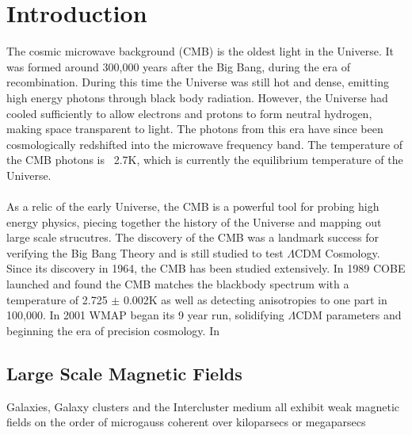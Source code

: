 \section{Introduction}

The cosmic microwave background (CMB) is the oldest light in the Universe. It was formed around 300,000 years after the Big Bang, during the era of recombination. During this time the Universe was still hot and dense, emitting high energy photons through black body radiation. However, the Universe had cooled sufficiently to allow electrons and protons to form neutral hydrogen, making space transparent to light. The photons from this era have since been cosmologically redshifted into the microwave frequency band. The temperature of the CMB photons is ~2.7K, which is currently the equilibrium temperature of the Universe. 
\\\\
As a relic of the early Universe, the CMB is a powerful tool for probing high energy physics, piecing together the history of the Universe and mapping out large scale strucutres. The discovery of the CMB was a landmark success for verifying the Big Bang Theory and is still studied to test $\Lambda$CDM Cosmology. Since its discovery in 1964, the CMB has been studied extensively. In 1989 COBE launched and found the CMB matches the blackbody spectrum with a temperature of 2.725 $\pm$ 0.002K as well as detecting anisotropies to one part in 100,000. In 2001 WMAP began its 9 year run, solidifying $\Lambda$CDM parameters and beginning the era of precision cosmology. In

\iffalse
> what the cmb is 
	- Oldest light in the Universe
	- from the era of recombination
	- in the microwave frequency band
	- ~2.7K, residual temperature of the Universe
> what is its significance
	- evidence for the big bang model
	- can large scale structure (lensing)
	- piece together history of Universe - pmfs and PGW - B-modes
	- not much else tbh???
> previous work done on the cmb
	- COBE
	- WMAP
	- PLANCK
	- etc.
\fi
\subsection{Large Scale Magnetic Fields}

Galaxies, Galaxy clusters and the Intercluster medium all exhibit weak magnetic fields on the order of microgauss coherent over kiloparsecs or megaparsecs

\iffalse
> What?
	- weak magnetic fields coherent over kilo to megaparsec scales
	- evidence: Faraday rotation + synchrotron emission + zeeman effect
> How?
	- hydrodynamics
	- stars
	- pmfs
\fi
